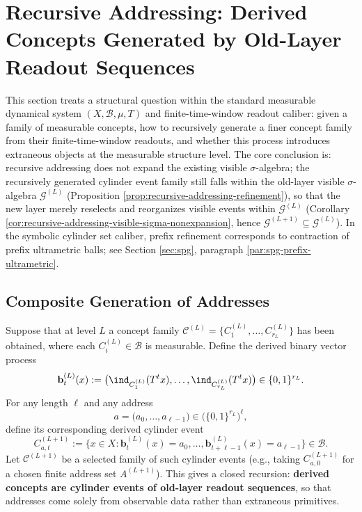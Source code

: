 \section{Recursive Addressing: Derived Concepts Generated by Old-Layer Readout Sequences}\label{sec:recursive-addressing}

This section treats a structural question within the standard measurable dynamical system \((X,\mathcal{B},\mu,T)\) and finite-time-window readout caliber: given a family of measurable concepts, how to recursively generate a finer concept family from their finite-time-window readouts, and whether this process introduces extraneous objects at the measurable structure level. The core conclusion is: recursive addressing does not expand the existing visible \(\sigma\)-algebra; the recursively generated cylinder event family still falls within the old-layer visible \(\sigma\)-algebra \(\mathcal{G}^{(L)}\) (Proposition \ref{prop:recursive-addressing-refinement}), so that the new layer merely reselects and reorganizes visible events within \(\mathcal{G}^{(L)}\) (Corollary \ref{cor:recursive-addressing-visible-sigma-nonexpansion}, hence \(\mathcal{G}^{(L+1)}\subseteq \mathcal{G}^{(L)}\)). In the symbolic cylinder set caliber, prefix refinement corresponds to contraction of prefix ultrametric balls; see Section \ref{sec:spg}, paragraph \ref{par:spg-prefix-ultrametric}.

\subsection{Composite Generation of Addresses}

Suppose that at level $L$ a concept family $\mathcal{C}^{(L)}=\{C^{(L)}_1,\dots,C^{(L)}_{r_L}\}$ has been obtained, where each $C^{(L)}_i\in\mathcal{B}$ is measurable. Define the derived binary vector process
\[
\mathbf{b}^{(L)}_t(x):=\bigl(\ind_{C^{(L)}_1}(T^t x),\dots,\ind_{C^{(L)}_{r_L}}(T^t x)\bigr)\in\{0,1\}^{r_L}.
\]
For any length $\ell$ and any address
\[
a=\bigl(a_0,\dots,a_{\ell-1}\bigr)\in\bigl(\{0,1\}^{r_L}\bigr)^\ell,
\]
define its corresponding derived cylinder event
\[
C^{(L+1)}_{a,t}:=\{x\in X:\mathbf{b}^{(L)}_t(x)=a_0,\dots,\mathbf{b}^{(L)}_{t+\ell-1}(x)=a_{\ell-1}\}\in\mathcal{B}.
\]
Let $\mathcal{C}^{(L+1)}$ be a selected family of such cylinder events (e.g., taking $C^{(L+1)}_{a,0}$ for a chosen finite address set $A^{(L+1)}$). This gives a closed recursion: \textbf{derived concepts are cylinder events of old-layer readout sequences}, so that addresses come solely from observable data rather than extraneous primitives.


